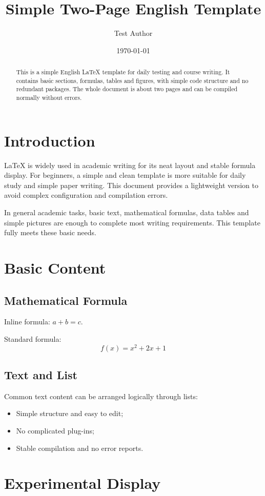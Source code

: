 \documentclass[11pt,a4paper]{article}
\title{Simple Two-Page English Template}
\author{Test Author}
\date{\today}
\begin{document}
\maketitle

\begin{abstract}
This is a simple English LaTeX template for daily testing and course writing. It contains basic sections, formulas, tables and figures, with simple code structure and no redundant packages. The whole document is about two pages and can be compiled normally without errors.
\end{abstract}

\section{Introduction}
LaTeX is widely used in academic writing for its neat layout and stable formula display. For beginners, a simple and clean template is more suitable for daily study and simple paper writing. This document provides a lightweight version to avoid complex configuration and compilation errors.

In general academic tasks, basic text, mathematical formulas, data tables and simple pictures are enough to complete most writing requirements. This template fully meets these basic needs.

\section{Basic Content}
\subsection{Mathematical Formula}
Inline formula: $a + b = c$.

Standard formula:
\[
f(x) = x^2 + 2x + 1
\]

\subsection{Text and List}
Common text content can be arranged logically through lists:
\begin{itemize}
    \item Simple structure and easy to edit;
    \item No complicated plug-ins;
    \item Stable compilation and no error reports.
\end{itemize}

\section{Experimental Display}
\end{document}
